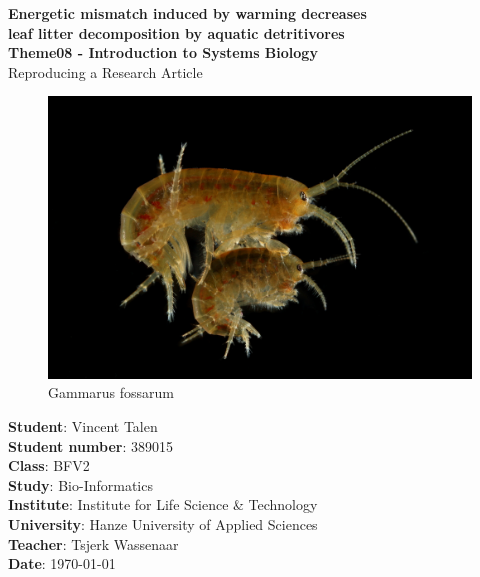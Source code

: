 

\begin{center}
  \topskip=45pt
  \LARGE{\textbf{Energetic mismatch induced by warming decreases\\leaf litter decomposition by aquatic detritivores}}\\
  \vspace*{20pt}
  \large{\textbf{Theme08 - Introduction to Systems Biology}}\\
  \large{Reproducing a Research Article}\\
  \vspace*{40pt}
  \begin{figure}
    \centering
    \includegraphics[width=130mm]{figures/gammarus_fossarum.jpeg}
    \caption{Gammarus fossarum}
    \label{fig:g.fossarum}
  \end{figure}
\end{center}
\vspace*{\fill}
\begin{flushright}
  \textbf{Student}: Vincent Talen\\
  \textbf{Student number}: 389015\\
  \textbf{Class}: BFV2\\
  \textbf{Study}: Bio-Informatics\\
  \textbf{Institute}: Institute for Life Science \& Technology\\
  \textbf{University}: Hanze University of Applied Sciences\\
  \textbf{Teacher}: Tsjerk Wassenaar\\
  \textbf{Date}: \today\\
\end{flushright}


